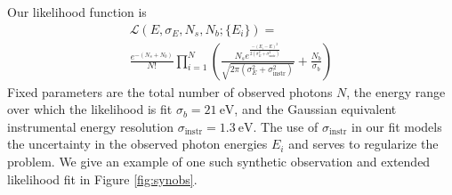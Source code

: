 \documentclass[aps,prd,10pt,twocolumn,superscriptaddress,showpacs]{revtex4-1}
\newcommand{\units}[1]{~\mathrm{#1}}
\begin{document}
Our likelihood function is
\begin{multline}
	\mathcal{L}(E, \sigma_E, N_s, N_b; \{E_i\}) =\\
	\frac{e^{-(N_s+N_b)}}{N!} \prod_{i=1}^{N}
	\left(\frac{N_s e^{\frac{-(E_i-E)^2}{2(\sigma_E^2+\sigma_\mathrm{instr}^2)}}}
	{\sqrt{2\pi(\sigma_E^2+\sigma_\mathrm{instr}^2)}}+\frac{N_b}{\sigma_b}\right)
\end{multline}
Fixed parameters are the total number
of observed photons $N$, the energy range over which the likelihood is fit $\sigma_b=21 \units{eV}$, 
and the Gaussian equivalent instrumental energy resolution $\sigma_\mathrm{instr}=1.3 \units{eV}$. The use of $\sigma_\mathrm{instr}$
in our fit models the uncertainty in the observed photon energies $E_i$ and serves to regularize the problem.
We give an example of one such synthetic observation and extended likelihood fit in Figure
\ref{fig:synobs}.


\end{document}

